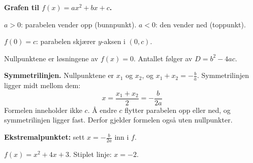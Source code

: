 \begin{mustkunne}
\begin{minipage}[t]{0.57\linewidth}
\vspace{0pt}\textbf{Grafen til $f(x) = ax^2 + bx + c$.}\par
$a > 0$: parabelen vender opp (bunnpunkt). $a < 0$: den vender ned (toppunkt).\par
$f(0) = c$: parabelen skjærer $y$-aksen i $(0, c)$.\par
Nullpunktene er løsningene av $f(x) = 0$. Antallet følger av $D = b^2 - 4ac$.\medskip\par
\textbf{Symmetrilinjen.} Nullpunktene er $x_1$ og $x_2$, og $x_1 + x_2 = -\frac{b}{a}$. Symmetrilinjen ligger midt mellom dem:
\[ x = \frac{x_1 + x_2}{2} = -\frac{b}{2a} \]
Formelen inneholder ikke $c$. Å endre $c$ flytter parabelen opp eller ned, og symmetrilinjen ligger fast. Derfor gjelder formelen også uten nullpunkter.\par
\textbf{Ekstremalpunktet:} sett $x = -\frac{b}{2a}$ inn i $f$.
\end{minipage}\hfill
\begin{minipage}[t]{0.40\linewidth}
\vspace{0pt}\centering
{}\par
{\footnotesize $f(x) = x^2 + 4x + 3$. Stiplet linje: $x = -2$.}
\end{minipage}
\end{mustkunne}

